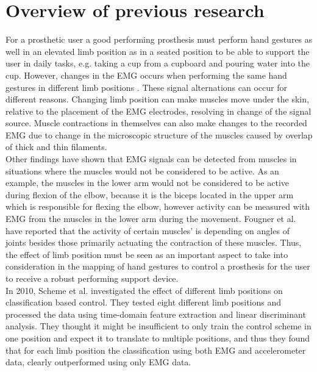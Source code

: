 \section{Overview of previous research}

For a prosthetic user a good performing prosthesis must perform hand gestures as well in an elevated limb position as in a seated position to be able to support the user in daily tasks, e.g. taking a cup from a cupboard and pouring water into the cup. However, changes in the EMG occurs when performing the same hand gestures in different limb positions \cite{Fougner2011, avella2006}. These signal alternations can occur for different reasons. Changing limb position can make muscles move under the skin, relative to the placement of the EMG electrodes, resolving in change of the signal source. Muscle contractions in themselves can also make changes to the recorded EMG due to change in the microscopic structure of the muscles caused by overlap of thick and thin filaments. \cite{martini} \\
Other findings have shown that EMG signals can be detected from muscles in situations where the muscles would not be considered to be active. As an example, the muscles in the lower arm would not be considered to be active during flexion of the elbow, because it is the biceps located in the upper arm which is responsible for flexing the elbow, however activity can be measured with EMG from the muscles in the lower arm during the movement. Fougner et al. \cite{Fougner2011} have reported that the activity of certain muscles' is depending on angles of joints besides those primarily actuating the contraction of these muscles. Thus, the effect of limb position must be seen as an important aspect to take into consideration in the mapping of hand gestures to control a prosthesis for the user to receive a robust performing support device. \\ %
In 2010, Scheme et al. \cite{Fougner2010} investigated the effect of different limb positions on classification based control. They tested eight different limb positions and processed the data using time-domain feature extraction and linear discriminant analysis. They thought it might be insufficient to only train the control scheme in one position and expect it to translate to multiple positions, and thus they found that for each limb position the classification using both EMG and accelerometer data, clearly outperformed using only EMG data. \cite{Fougner2010} \\
